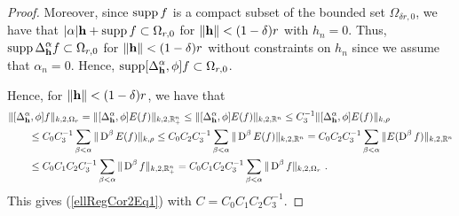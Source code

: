\begin{proof}
Moreover, since $\operatorname{supp} f$ is a compact subset of the bounded set
$\Omega_{\delta r,0}$, we have that
$|\alpha| \mathbf{h} + \operatorname{supp} f \subset \Omega_{r,0}$
for $\|\mathbf{h}\| < (1-\delta)r$ with $h_n = 0$.    Thus,
$\displaystyle \operatorname{supp} \Delta^\alpha_{\mathbf{h}} f \subset \Omega_{r,0}$ for
$\|\mathbf{h}\| < (1-\delta)r$ without constraints on $h_n$ since we assume
that $\alpha_n = 0$.  Hence,
$\displaystyle \operatorname{supp} [\Delta^\alpha_{\mathbf{h}}, \phi] f \subset \Omega_{r,0}$.

Hence, for $\|\mathbf{h}\| < (1-\delta)r$, we have that
\begin{align*}
&\| [\Delta^\alpha_{\mathbf{h}}, \phi] f \|_{k,2,\Omega_r}
= \| [\Delta^\alpha_{\mathbf{h}}, \phi] E(f) \|_{k,2,\mathbb{R}^n_+}
\leq \| [\Delta^\alpha_{\mathbf{h}}, \phi] E(f) \|_{k,2,\mathbb{R}^n}
\leq C_3^{-1} \| [\Delta^\alpha_{\mathbf{h}}, \phi] E(f) \|_{k,\rho} \\
&\qquad \leq C_0 C_3^{-1} \sum_{\beta<\alpha} \| \operatorname{D}^\beta E(f) \|_{k,\rho}
\leq C_0 C_2 C_3^{-1} \sum_{\beta<\alpha} \| \operatorname{D}^\beta E(f)  \|_{k,2,\mathbb{R}^n}
= C_0 C_2 C_3^{-1} \sum_{\beta<\alpha} \| E(\operatorname{D}^\beta f) \|_{k,2,\mathbb{R}^n}\\
&\qquad \leq C_0 C_1 C_2 C_3^{-1}
\sum_{\beta<\alpha} \| \operatorname{D}^\beta f \|_{k,2,\mathbb{R}^n_+}
=  C_0 C_1 C_2 C_3^{-1} \sum_{\beta<\alpha} \| \operatorname{D}^\beta f \|_{k,2,\Omega_r} \ .
\end{align*}
This gives (\ref{ellRegCor2Eq1}) with $C = C_0 C_1 C_2 C_3^{-1}$.
\end{proof}

